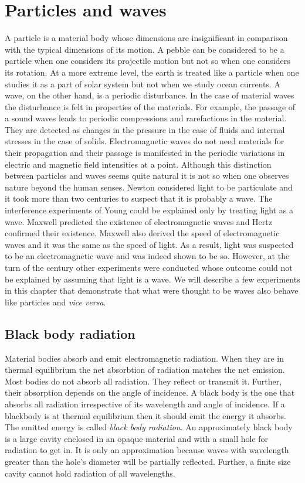 \chapter{Particles and waves}\label{c2}
A particle is a material body whose dimensions are insignificant in comparison
with the typical dimensions of its motion. A pebble can be considered to be a
particle when one considers its projectile motion but not so when one considers
its rotation. At a more extreme level, the earth is treated like a particle when
one studies it as a part of solar system but not when we study ocean currents.
A wave, on the other hand, is a periodic disturbance. In the case of material
waves the disturbance is felt in properties of the materials. For example, the
passage of a sound waves leads to periodic compressions and rarefactions in the
material. They are detected as changes in the pressure in the case of fluids and
internal stresses in the case of solids. Electromagnetic waves do not need 
materials for their propagation and their passage is manifested in the periodic
variations in electric and magnetic field intensities at a point. Although this
distinction between particles and waves seems quite natural it is not so when 
one observes nature beyond the human senses. Newton considered light to be
particulate and it took more than two centuries to suspect that it is probably
a wave. The interference experiments of Young could be explained only by 
treating light as a wave. Maxwell predicted the existence of electromagnetic
waves and Hertz confirmed their existence. Maxwell also derived the speed of
electromagnetic waves and it was the same as the speed of light. As a result,
light was suspected to be an electromagnetic wave and was indeed shown to be so.
However, at the turn of the century other experiments were conducted whose 
outcome could not be explained by assuming that light is a wave. We will 
describe a few experiments in this chapter that demonstrate that what were
thought to be waves also behave like particles and \emph{vice versa}.

\section{Black body radiation}\label{c2s1}
Material bodies absorb and emit electromagnetic radiation. When they are in
thermal equilibrium the net absorbtion of radiation matches the net emission.
Most bodies do not absorb all radiation. They reflect or transmit it. Further,
their absorption depends on the angle of incidence. A black body is the one 
that absorbs all radiation irrespective of its wavelength and angle of 
incidence. If a blackbody is at thermal equilibrium then it should emit the
energy it absorbs. The emitted energy is called \emph{black body radiation}.
An approximately black body is a large cavity enclosed in an opaque material 
and with a small hole for radiation to get in. It is only an approximation 
because waves with wavelength greater than the hole's diameter will be 
partially reflected. Further, a finite size cavity cannot hold radiation of all
wavelengths.

